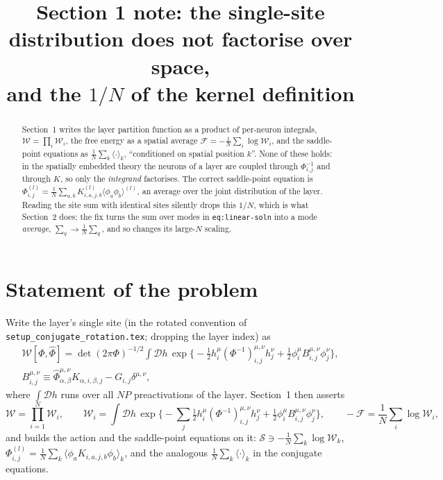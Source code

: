 \documentclass[11pt,a4paper]{article}
\title{Section 1 note: the single-site distribution does not factorise over space,\\
and the $1/N$ of the kernel definition}
\author{}
\date{}
\newcommand{\D}{\mathcal D}
\newcommand{\W}{\mathcal W}
\newcommand{\F}{\mathcal F}
\newcommand{\Sact}{\mathcal S}
\begin{document}
\maketitle

\begin{abstract}
Section~1 writes the layer partition function as a product of per-neuron
integrals, $\W = \prod_i \W_i$, the free energy as a spatial average
$\F = -\frac1N\sum_i\log\W_i$, and the saddle-point equations as
$\frac1N\sum_k\langle\cdot\rangle_k$, ``conditioned on spatial position $k$''.
None of these holds: in the spatially embedded theory the neurons of a layer
are coupled through $\Phi^{-1}_{i,j}$ and through $K$, so only the
\emph{integrand} factorises. The correct saddle-point equation is
$\Phi^{(l)}_{i,j} = \frac1N\sum_{a,b}K^{(l)}_{i,a,j,b}\langle\phi_a\phi_b\rangle^{(l)}$,
an average over the joint distribution of the layer. Reading the site sum with
identical sites silently drops this $1/N$, which is what Section~2 does; the
fix turns the sum over modes in \texttt{eq:linear-soln} into a mode
\emph{average}, $\sum_q \to \frac1N\sum_q$, and so changes its large-$N$
scaling.
\end{abstract}

\section{Statement of the problem}

Write the layer's single site (in the rotated convention of
\texttt{setup\_conjugate\_rotation.tex}; dropping the layer index) as
\begin{gather}
  \W[\Phi,\hat\Phi] = \det(2\pi\Phi)^{-1/2}\int\D h\,\exp\Big\{
   -\tfrac12 h^\mu_i(\Phi^{-1})^{\mu,\nu}_{i,j}h^\nu_j
   + \tfrac12\phi^\mu_i B^{\mu,\nu}_{i,j}\phi^\nu_j\Big\},
  \label{eq:W}\\
  B^{\mu,\nu}_{i,j} \equiv \hat\Phi^{\mu,\nu}_{\alpha,\beta}K_{\alpha,i,\beta,j} - G_{i,j}\delta^{\mu,\nu},
  \nonumber
\end{gather}
where $\int\D h$ runs over all $NP$ preactivations of the layer. Section~1 then
asserts
\begin{equation}
  \W = \prod_{i=1}^N \W_i,\qquad
  \W_i = \int\D h\,\exp\Big\{-\sum_j\tfrac12 h^\mu_i(\Phi^{-1})^{\mu,\nu}_{i,j}h^\nu_j
   + \tfrac12\phi^\mu_i B^{\mu,\nu}_{i,j}\phi^\nu_j\Big\},
  \qquad
  -\F = \frac1N\sum_i\log\W_i ,
  \label{eq:claim}
\end{equation}
and builds the action and the saddle-point equations on it:
$\Sact \ni -\frac1N\sum_k\log\W_k$,
$\Phi^{(l)}_{i,j} = \frac1N\sum_k\langle\phi_aK_{i,a,j,b}\phi_b\rangle_k$, and the
analogous $\frac1N\sum_k\langle\cdot\rangle_k$ in the conjugate equations.
\end{document}
